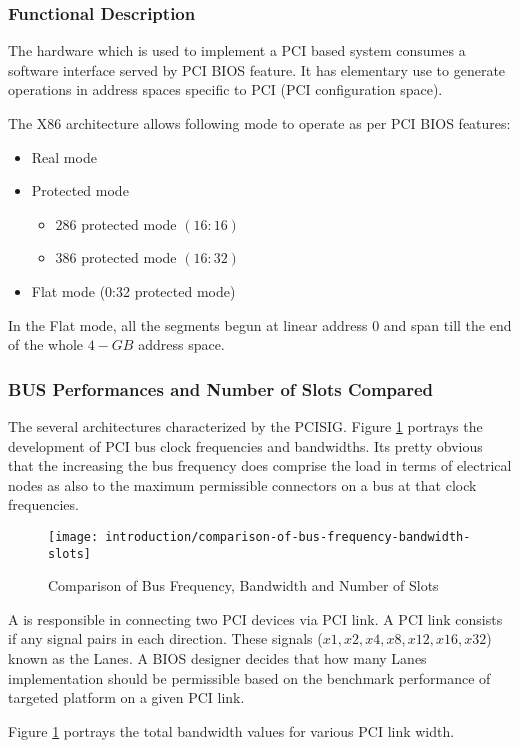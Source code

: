 \subsubsection{Functional Description}
The hardware which is used to implement a PCI based system consumes a software interface served by PCI BIOS feature. It has elementary use to generate operations in address spaces specific to PCI (PCI configuration space).

The X86 architecture allows following mode to operate as per PCI BIOS features:
\begin{itemize}
  \item Real mode
  \item Protected mode
    \begin{itemize}
      \item $ 286 $ protected mode $ (16:16) $
      \item $ 386 $ protected mode $ (16:32) $
    \end{itemize}
  \item Flat mode (0:32 protected mode)
\end{itemize}
In the Flat mode, all the segments begun at linear address $ 0 $ and span till the end of the whole $ 4-GB $ address space.

\subsubsection{BUS Performances and Number of Slots Compared}
The several architectures characterized by the PCISIG. Figure \ref{fig:comparison-of-bus-frequency-bandwidth-slots} portrays the development of PCI bus clock frequencies and bandwidths. Its pretty obvious that the increasing the bus frequency does comprise the load in terms of electrical nodes as also to the maximum permissible connectors on a bus at that clock frequencies.

\begin{figure}[!htbp]
	\centering
	\texttt{[image: introduction/comparison-of-bus-frequency-bandwidth-slots]}
	\caption{Comparison of Bus Frequency, Bandwidth and Number of Slots}\label{fig:comparison-of-bus-frequency-bandwidth-slots}
\end{figure}

A  is responsible in connecting two PCI devices via PCI link. A PCI link consists if any signal pairs in each direction. These signals ($ x1, x2, x4, x8, x12, x16, x32 $) known as the Lanes. A BIOS designer decides that how many Lanes implementation should be permissible based on the benchmark performance of targeted platform on a given PCI link.

Figure \ref{fig:comparison-of-bus-frequency-bandwidth-slots} portrays the total bandwidth values for various PCI link width.


